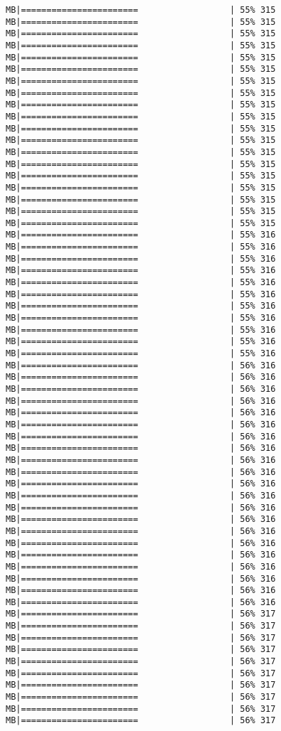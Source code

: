 \documentclass[
]{article}
\begin{document}
\begin{verbatim}
MB|=======================                  | 55% 315 MB|=======================                  | 55% 315 MB|=======================                  | 55% 315 MB|=======================                  | 55% 315 MB|=======================                  | 55% 315 MB|=======================                  | 55% 315 MB|=======================                  | 55% 315 MB|=======================                  | 55% 315 MB|=======================                  | 55% 315 MB|=======================                  | 55% 315 MB|=======================                  | 55% 315 MB|=======================                  | 55% 315 MB|=======================                  | 55% 315 MB|=======================                  | 55% 315 MB|=======================                  | 55% 315 MB|=======================                  | 55% 315 MB|=======================                  | 55% 315 MB|=======================                  | 55% 315 MB|=======================                  | 55% 315 MB|=======================                  | 55% 316 MB|=======================                  | 55% 316 MB|=======================                  | 55% 316 MB|=======================                  | 55% 316 MB|=======================                  | 55% 316 MB|=======================                  | 55% 316 MB|=======================                  | 55% 316 MB|=======================                  | 55% 316 MB|=======================                  | 55% 316 MB|=======================                  | 55% 316 MB|=======================                  | 55% 316 MB|=======================                  | 56% 316 MB|=======================                  | 56% 316 MB|=======================                  | 56% 316 MB|=======================                  | 56% 316 MB|=======================                  | 56% 316 MB|=======================                  | 56% 316 MB|=======================                  | 56% 316 MB|=======================                  | 56% 316 MB|=======================                  | 56% 316 MB|=======================                  | 56% 316 MB|=======================                  | 56% 316 MB|=======================                  | 56% 316 MB|=======================                  | 56% 316 MB|=======================                  | 56% 316 MB|=======================                  | 56% 316 MB|=======================                  | 56% 316 MB|=======================                  | 56% 316 MB|=======================                  | 56% 316 MB|=======================                  | 56% 316 MB|=======================                  | 56% 316 MB|=======================                  | 56% 316 MB|=======================                  | 56% 317 MB|=======================                  | 56% 317 MB|=======================                  | 56% 317 MB|=======================                  | 56% 317 MB|=======================                  | 56% 317 MB|=======================                  | 56% 317 MB|=======================                  | 56% 317 MB|=======================                  | 56% 317 MB|=======================                  | 56% 317 MB|=======================                  | 56% 317 
\end{verbatim}
\end{document}
